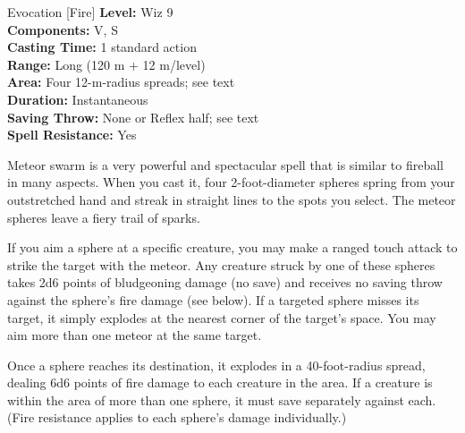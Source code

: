 {Evocation [Fire]}
{
	\textbf{Level:}
	Wiz 9\\
	\textbf{Components:}
	V, S\\
	\textbf{Casting Time:}
	1 standard action\\
	\textbf{Range:}
	Long (120 m + 12 m/level)\\
	\textbf{Area:}
	Four 12-m-radius spreads; see text\\
	\textbf{Duration:}
	Instantaneous\\
	\textbf{Saving Throw:}
	None or Reflex half; see text\\
	\textbf{Spell Resistance:}
	Yes\\
}
{
	Meteor swarm is a very powerful and spectacular spell that is similar to fireball in many aspects. When you cast it, four 2-foot-diameter spheres spring from your outstretched hand and streak in straight lines to the spots you select. The meteor spheres leave a fiery trail of sparks.

	If you aim a sphere at a specific creature, you may make a ranged touch attack to strike the target with the meteor. Any creature struck by one of these spheres takes 2d6 points of bludgeoning damage (no save) and receives no saving throw against the sphere's fire damage (see below). If a targeted sphere misses its target, it simply explodes at the nearest corner of the target's space. You may aim more than one meteor at the same target.

	Once a sphere reaches its destination, it explodes in a 40-foot-radius spread, dealing 6d6 points of fire damage to each creature in the area. If a creature is within the area of more than one sphere, it must save separately against each. (Fire resistance applies to each sphere's damage individually.)

}
